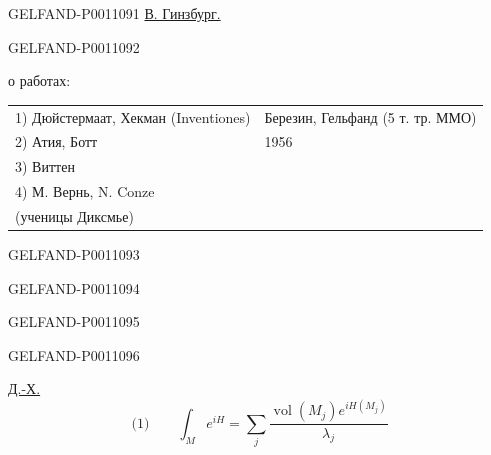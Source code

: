 \begin{GelfandAdjacentEvidence}{GELFAND-P001109}{1}
\underline{В. Гинзбург.}
\end{GelfandAdjacentEvidence}
\begin{GelfandAdjacentEvidence}{GELFAND-P001109}{2}


о работах:

\begin{center}
\begin{tabular}{@{}l|l@{}}
1) Дюйстермаат, Хекман (Inventiones) &
Березин, Гельфанд (5 т. тр. ММО)\\
2) Атия, Ботт & \hfill 1956\\
3) Виттен & \\
4) М. Вернь, N. Conze & \\
\hspace{1em}(ученицы Диксмье) &
\end{tabular}
\end{center}
\end{GelfandAdjacentEvidence}
\begin{GelfandAdjacentEvidence}{GELFAND-P001109}{3}

\end{GelfandAdjacentEvidence}
\begin{GelfandAdjacentEvidence}{GELFAND-P001109}{4}

\end{GelfandAdjacentEvidence}
\begin{GelfandAdjacentEvidence}{GELFAND-P001109}{5}

\end{GelfandAdjacentEvidence}
\begin{GelfandAdjacentEvidence}{GELFAND-P001109}{6}


\underline{Д.-Х.}
\[
\text{(1)}\qquad\int_M e^{iH}
=\sum_j\frac{\operatorname{vol}(M_j)e^{iH(M_j)}}{\lambda_j}
\]
\end{GelfandAdjacentEvidence}

